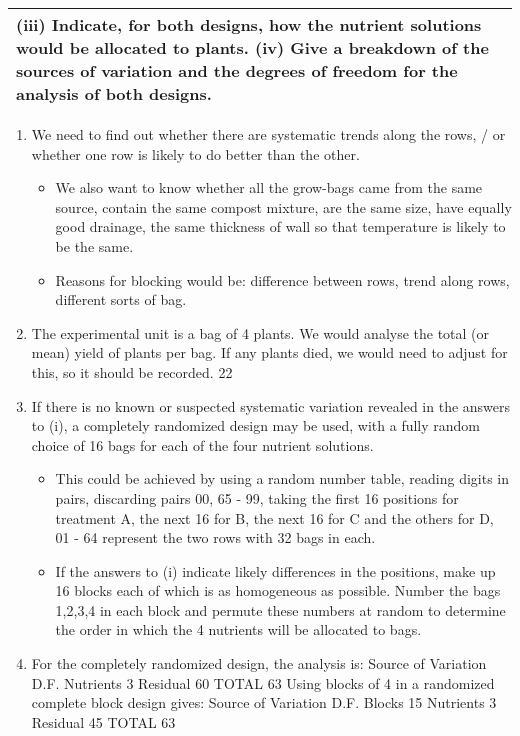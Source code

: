 \documentclass[a4paper,12pt]{article}
\begin{document}
\begin{table}[ht!]
 \centering
 \begin{tabular}{|p{15cm}|}
 \hline  
(iii) Indicate, for both designs, how the nutrient solutions would be allocated to plants.
(iv) Give a breakdown of the sources of variation and the degrees of freedom for the analysis of both designs.
\\ \hline
  \end{tabular}
\end{table}
\begin{enumerate}
\item We need to find out whether there are systematic trends along the rows,
/ or whether one row is likely to do better than the other.
\begin{itemize}
\item We also want to know whether all the grow-bags came from the same source,
contain the same compost mixture, are the same size, have equally good
drainage, the same thickness of wall so that temperature is likely to be the
same.
\item Reasons for blocking would be: difference between rows, trend along rows,
different sorts of bag.
\end{itemize}
\item  The experimental unit is a bag of 4 plants. We would analyse the total (or
mean) yield of plants per bag. If any plants died, we would need to adjust
for this, so it should be recorded.
22
\item  If there is no known or suspected systematic variation revealed in the answers
to (i), a completely randomized design may be used, with a fully random
choice of 16 bags for each of the four nutrient solutions. 
\begin{itemize}
\item This could be
achieved by using a random number table, reading digits in pairs, discarding
pairs 00, 65 - 99, taking the first 16 positions for treatment A, the next 16
for B, the next 16 for C and the others for D, 01 - 64 represent the two rows
with 32 bags in each.
\item If the answers to (i) indicate likely differences in the positions, make up 16
blocks each of which is as homogeneous as possible. Number the bags 1,2,3,4
in each block and permute these numbers at random to determine the order
in which the 4 nutrients will be allocated to bags.
\end{itemize}
\item For the completely randomized design, the analysis is:
Source of Variation D.F.
Nutrients 3
Residual 60
TOTAL 63
Using blocks of 4 in a randomized complete block design gives:
Source of Variation D.F.
Blocks 15
Nutrients 3
Residual 45
TOTAL 63

\end{enumerate}
\end{document}
